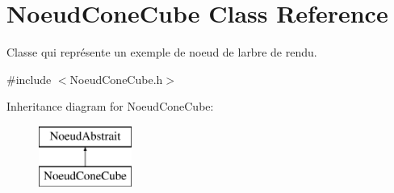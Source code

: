\hypertarget{class_noeud_cone_cube}{}\section{Noeud\+Cone\+Cube Class Reference}
\label{class_noeud_cone_cube}


Classe qui représente un exemple de noeud de l\textquotesingle{}arbre de rendu.  




{\ttfamily \#include $<$Noeud\+Cone\+Cube.\+h$>$}

Inheritance diagram for Noeud\+Cone\+Cube\+:\begin{figure}[H]
\begin{center}
\leavevmode
\includegraphics[height=2.000000cm]{class_noeud_cone_cube}
\end{center}
\end{figure}
